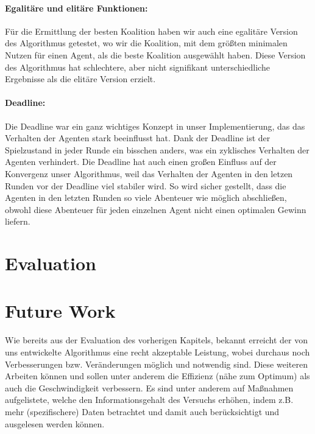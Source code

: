 \documentclass[fleqn,10pt]{SelfArx} %
\begin{document}
\paragraph{Egalitäre und elitäre Funktionen:} Für die Ermittlung der besten Koalition haben wir auch eine egalitäre Version des Algorithmus getestet, wo wir die Koalition, mit dem größten minimalen Nutzen für einen Agent, als die beste Koalition ausgewählt haben. Diese Version des Algorithmus hat schlechtere, aber nicht signifikant unterschiedliche Ergebnisse als die elitäre Version erzielt.


\paragraph{Deadline:}
Die Deadline war ein ganz wichtiges Konzept in unser Implementierung, das das Verhalten der Agenten stark beeinflusst hat. Dank der Deadline ist der Spielzustand in jeder Runde ein bisschen anders, was ein zyklisches Verhalten der Agenten verhindert. Die Deadline hat auch einen großen Einfluss auf der Konvergenz unser Algorithmus, weil das Verhalten der Agenten in den letzen Runden vor der Deadline viel stabiler wird. So wird sicher gestellt, dass die Agenten in den letzten Runden so viele Abenteuer wie möglich abschließen, obwohl diese Abenteuer für jeden einzelnen Agent nicht einen optimalen Gewinn liefern.

\section{Evaluation}
\label{sec:Evaluation}

\section{Future Work}
\label{sec:Future}

Wie bereits aus der Evaluation des vorherigen Kapitels, bekannt erreicht der von uns entwickelte Algorithmus eine recht akzeptable Leistung, wobei durchaus noch Verbesserungen bzw. Veränderungen möglich und notwendig sind. Diese weiteren Arbeiten können und sollen unter anderem die Effizienz (nähe zum Optimum) als auch die Geschwindigkeit verbessern. Es sind unter anderem auf Maßnahmen aufgelistete, welche den Informationsgehalt des Versuchs erhöhen, indem z.B. mehr (spezifischere) Daten betrachtet und damit auch berücksichtigt und ausgelesen werden können.
\end{document}
